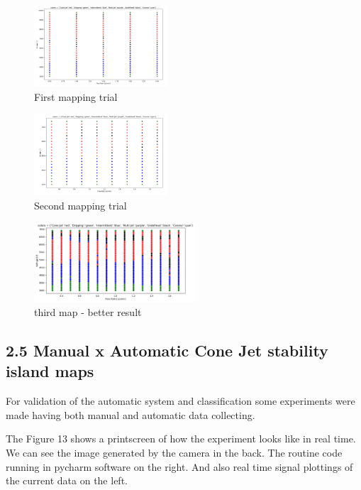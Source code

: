 \begin{multicols}{3}


    \begin{figure}[H]
        \center
        \includegraphics[width=5cm]{Figuras/report3/map1.png}
        \caption{First mapping trial}
    \end{figure}

    \begin{figure}[H]
        \center
        \includegraphics[width=5cm]{Figuras/report3/map2.png}
        \caption{Second mapping trial}
    \end{figure}


    \begin{figure}[H]
        \center
        \includegraphics[width=6cm]{Figuras/report3/map3.png}
        \caption{third map - better result}
    \end{figure}

\end{multicols}



\subsection*{2.5 Manual x Automatic Cone Jet stability island maps}

For validation of the automatic system and classification some experiments were made having both manual and automatic data collecting.

The Figure 13 shows a printscreen of how the experiment looks like in real time.
We can see the image generated by the camera in the back.
The routine code running in pycharm software on the right.
And also real time signal plottings of the current data on the left.

